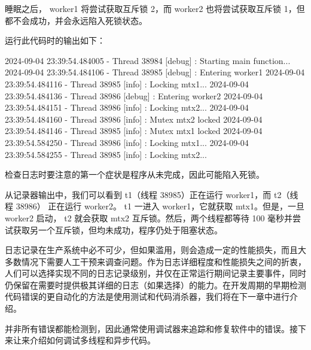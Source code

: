 睡眠之后， worker1 将尝试获取互斥锁 2，而 worker2 也将尝试获取互斥锁 1，但都不会成功，并会永远陷入死锁状态。

运行此代码时的输出如下：

\begin{shell}
2024-09-04 23:39:54.484005 - Thread 38984 [debug] : Starting main
function...
2024-09-04 23:39:54.484106 - Thread 38985 [debug] : Entering worker1
2024-09-04 23:39:54.484116 - Thread 38985 [info] : Locking mtx1...
2024-09-04 23:39:54.484136 - Thread 38986 [debug] : Entering worker2
2024-09-04 23:39:54.484151 - Thread 38986 [info] : Locking mtx2...
2024-09-04 23:39:54.484160 - Thread 38986 [info] : Mutex mtx2 locked
2024-09-04 23:39:54.484146 - Thread 38985 [info] : Mutex mtx1 locked
2024-09-04 23:39:54.584250 - Thread 38986 [info] : Locking mtx1...
2024-09-04 23:39:54.584255 - Thread 38985 [info] : Locking mtx2...
\end{shell}

检查日志时要注意的第一个症状是程序从未完成，因此可能陷入死锁。

从记录器输出中，我们可以看到 t1（线程 38985）正在运行 worker1，而 t2（线程 38986） 正在运行 worker2。 t1 一进入 worker1，它就获取 mtx1。但是，一旦 worker2 启动， t2 就会获取 mtx2 互斥锁。然后，两个线程都等待 100 毫秒并尝试获取另一个互斥锁，但均未成功，程序仍处于阻塞状态。

日志记录在生产系统中必不可少，但如果滥用，则会造成一定的性能损失，而且大多数情况下需要人工干预来调查问题。作为日志详细程度和性能损失之间的折衷，人们可以选择实现不同的日志记录级别，并仅在正常运行期间记录主要事件，同时仍保留在需要时提供极其详细的日志（如果选择）的能力。在开发周期的早期检测代码错误的更自动化的方法是使用测试和代码消杀器，我们将在下一章中进行介绍。

并非所有错误都能检测到，因此通常使用调试器来追踪和修复软件中的错误。接下来让来介绍如何调试多线程和异步代码。





